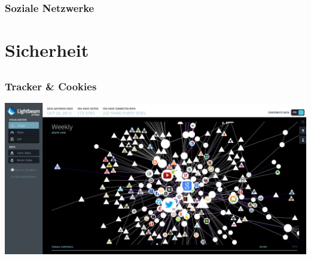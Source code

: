 \documentclass[12pt, table]{beamer}
\begin{document}
\begin{frame}
	\frametitle{Soziale Netzwerke}
	\begin{center}
	\end{center}
\end{frame}

\section{Sicherheit}
\subsection{}

\begin{frame}
    \frametitle{Tracker \& Cookies}
    \begin{center}
    	\includegraphics[height=0.7\textheight]{../img/lightbeam.png}
    \end{center}
\end{frame}
\end{document}
